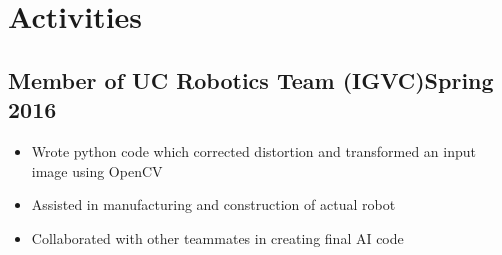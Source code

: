 \section{Activities}
\subsection{Member of UC Robotics Team (IGVC)\hfill Spring 2016}
\begin{itemize}
    \itemsep0em
    \item Wrote python code which corrected distortion and transformed an input image using OpenCV
    \item Assisted in manufacturing and construction of actual robot
    \item Collaborated with other teammates in creating final AI code
\end{itemize}
